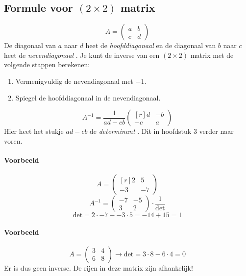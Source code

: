 \subsection{Formule voor $(2 \times 2)$ matrix}\label{sec:2x2formule}
\[A = \begin{pmatrix} a & b \\ c & d \end{pmatrix} \]
De diagonaal van $a$ naar $d$ heet de \emph{hoofddiagonaal}  en de diagonaal van $b$ naar $c$ heet de \emph{nevendiagonaal} . Je kunt de inverse van een $(2 \times 2)$ matrix met de volgende stappen berekenen:
\begin{enumerate}
	\item Vermenigvuldig de nevendiagonaal met $-1$.
	\item Spiegel de hoofddiagonaal in de nevendiagonaal.
\end{enumerate}
\[A^{-1} = \frac{1}{ad - cb} \begin{pmatrix*}[r] d & -b \\ -c & a \end{pmatrix*} \]
Hier heet het stukje $ad - cb$ de \emph{determinant} . Dit in hoofdstuk 3 %
verder naar voren.

\paragraph{Voorbeeld}
\[ A = \begin{pmatrix*}[r] 2 & 5 \\ -3 & -7 \end{pmatrix*} \]
\[ A^{-1} = \begin{pmatrix*} -7 & -5 \\ 3 & 2 \end{pmatrix*} \cdot \frac{1}{\mbox{det}} \]
\[ \mbox{det} = 2 \cdot -7 - -3 \cdot 5 = -14 + 15 = 1 \]

\paragraph{Voorbeeld}
\[ A = \begin{pmatrix} 3 & 4 \\ 6 & 8 \end{pmatrix} \to \mbox{det} = 3 \cdot 8 - 6 \cdot 4 = 0 \]
Er is dus geen inverse. De rijen in deze matrix zijn afhankelijk!

